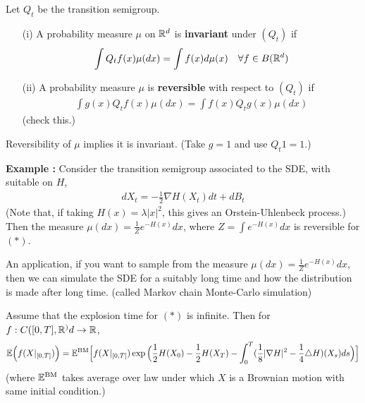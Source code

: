 \documentclass[12pt,a4paper]{article}
\begin{document}
 Let $Q_t$ be the transition semigroup.
\begin{itemize}
\item[(i)] A probability measure $\mu$ on $\mathbb{R}^d$ is \textbf{invariant} under $(Q_t)$ if
\begin{align*}
\int Q_t f(x) \mu(dx) = \int f(x) d\mu(x) \quad \forall f\in B(\mathbb{R}^d)
\end{align*} 
\item[(ii)] A probability measure $\mu$ is \textbf{reversible} with respect to $(Q_t)$ if
\begin{align*}
\int g(x) Q_t f(x) \mu(dx) = \int f(x) Q_t g(x) \mu(dx)
\end{align*}
(check this.) 
\end{itemize}
\s

\fact Reversibility of $\mu$ implies it is invariant. (Take $g=1$ and use $Q_t 1=1$.)
\s

\textbf{Example :} Consider the transition semigroup associated to the SDE, with suitable on $H$,
\begin{align*}
dX_t = -\frac{1}{2}\nabla H(X_t) dt + dB_t
\end{align*}
(Note that, if taking $H(x)=\lambda |x|^2$, this gives an Orstein-Uhlenbeck process.) Then the measure $\mu(dx) = \frac{1}{Z} e^{-H(x)}dx$, where $Z= \int e^{-H(x)}dx$ is reversible for $(*)$.

\quad An application, if you want to sample from the measure $\mu(dx) = \frac{1}{Z} e^{-H(x)}dx$, then we can simulate the SDE for a suitably long time and how the distribution is made after long time. (called Markov chain Monte-Carlo simulation)
\s

\lem Assume that the explosion time for $(*)$ is infinite. Then for $f: C([0, T], \mathbb{R}^)d\rightarrow \mathbb{R}$,
\begin{align*}
\mathbb{E} \Big( f(X|_{[0, T]}) \Big) = \mathbb{E}^{\text{BM}} \Big[ f(X|_{[0,T]}) \exp \Big( \frac{1}{2} H(X_0) - \frac{1}{2} H(X_T) - \int_0^T (\frac{1}{8} |\nabla H|^2 - \frac{1}{4} \triangle H) (X_s) ds \Big) \Big]
\end{align*}
(where $\mathbb{E}^{\text{BM}}$ takes average over law under which $X$ is a Brownian motion with same initial condition.)
\end{document}
